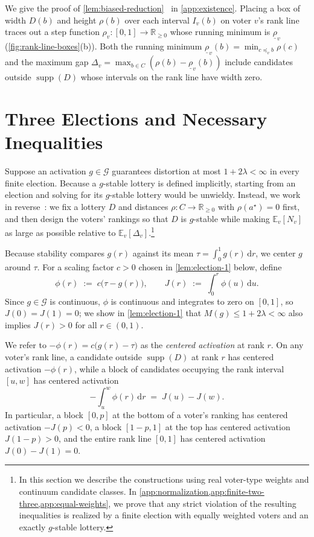 \documentclass[11pt]{article}
\numberwithin{equation}{section}
\theoremstyle{plain}
\theoremstyle{definition}
\newcommand{\E}{\mathbb{E}}
\newcommand{\R}{\mathbb{R}}
\newcommand{\1}{\mathbf{1}}
\newcommand{\lowrho}{\underline{\rho}}
\newcommand{\supp}{\operatorname{supp}}
\newcommand{\calG}{\mathcal{G}}
\begin{document}
We give the proof of \cref{lem:biased-reduction}~\cite{CharikarRamakrishnan22,CaiEtAl26b} in \cref{app:existence}. Placing a box of width $D(b)$ and height $\rho(b)$ over each interval $I_v(b)$ on voter $v$'s rank line traces out a step function $\rho_v \colon [0, 1] \to \R_{\ge 0}$ whose running minimum is $\lowrho_v$ (\cref{fig:rank-line-boxes}(b)). Both the running minimum $\lowrho_v(b) = \min_{c \preceq_v b} \rho(c)$ and the maximum gap $\Delta_v = \max_{b \in C}(\rho(b) - \lowrho_v(b))$ include candidates outside $\supp(D)$ whose intervals on the rank line have width zero.

\section{Three Elections and Necessary Inequalities}
\label{sec:elections}

Suppose an activation $g \in \calG$ guarantees distortion at most $1 + 2\lambda < \infty$ in every finite election. Because a $g$-stable lottery is defined implicitly, starting from an election and solving for its $g$-stable lottery would be unwieldy. Instead, we work in reverse~\cite{CaiEtAl26b}: we fix a lottery $D$ and distances $\rho \colon C \to \R_{\ge 0}$ with $\rho(a^\star) = 0$ first, and then design the voters' rankings so that $D$ is $g$-stable while making $\E_v[N_v]$ as large as possible relative to $\E_v[\Delta_v]$.\footnote{In this section we describe the constructions using real voter-type weights and continuum candidate classes. In \cref{app:normalization,app:finite-two-three,app:equal-weights}, we prove that any strict violation of the resulting inequalities is realized by a finite election with equally weighted voters and an exactly $g$-stable lottery.}

Because stability compares $g(r)$ against its mean $\tau = \int_0^1 g(r)\,\mathrm{d}r$, we center $g$ around $\tau$. For a scaling factor $c > 0$ chosen in \cref{lem:election-1} below, define
\begin{equation}
  \phi(r) \;:=\; c\bigl(\tau - g(r)\bigr),
  \qquad
  J(r) \;:=\; \int_0^r \phi(u)\,\mathrm{d}u.
  \label{eq:score-primitive-def}
\end{equation}
Since $g \in \calG$ is continuous, $\phi$ is continuous and integrates to zero on $[0, 1]$, so $J(0) = J(1) = 0$; we show in \cref{lem:election-1} that $M(g) \le 1 + 2\lambda < \infty$ also implies $J(r) > 0$ for all $r \in (0, 1)$.

We refer to $-\phi(r) = c\bigl(g(r) - \tau\bigr)$ as the \emph{centered activation} at rank $r$. On any voter's rank line, a candidate outside $\supp(D)$ at rank $r$ has centered activation $-\phi(r)$, while a block of candidates occupying the rank interval $[u, w]$ has centered activation
\[
  -\int_u^w \phi(r)\,\mathrm{d}r \;=\; J(u) - J(w).
\]
In particular, a block $[0, p]$ at the bottom of a voter's ranking has centered activation $-J(p) < 0$, a block $[1 - p, 1]$ at the top has centered activation $J(1 - p) > 0$, and the entire rank line $[0, 1]$ has centered activation $J(0) - J(1) = 0$.
\end{document}
